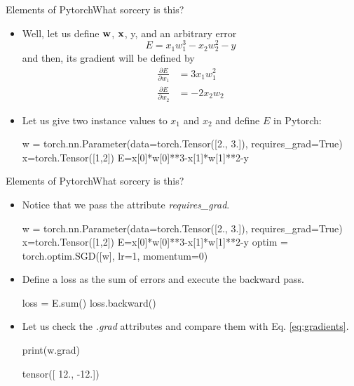 \documentclass{beamer}
\begin{document}
\begin{frame}[fragile]{Elements of Pytorch}{What sorcery is this?}
\begin{itemize}
    \item Well, let us define ${\bf w}$, ${\bf x}$, y, and an arbitrary error 
    \begin{equation}
    E = x_1w_1^3 -x_2w_2^2-y
    \end{equation}
    and then, its gradient will be defined by 
    \begin{equation}\label{eq:gradients}
        \begin{split}
            \frac{\partial E}{\partial w_1}&=3x_1w_1^2\\
            \frac{\partial E}{\partial w_2}&=-2x_2w_2
        \end{split}
    \end{equation}
    \item Let us give two instance values to $x_1$ and $x_2$ and define $E$ in Pytorch:
\begin{python}
w = torch.nn.Parameter(data=torch.Tensor([2., 3.]), requires_grad=True)
x=torch.Tensor([1,2]) 
E=x[0]*w[0]**3-x[1]*w[1]**2-y
\end{python}
\end{itemize}
\end{frame}

\begin{frame}[fragile]{Elements of Pytorch}{What sorcery is this?}
\begin{itemize}
    \item Notice that we pass the attribute \emph{requires\_grad}.
\begin{python}
w = torch.nn.Parameter(data=torch.Tensor([2., 3.]), requires_grad=True)
x=torch.Tensor([1,2]) 
E=x[0]*w[0]**3-x[1]*w[1]**2-y
optim = torch.optim.SGD([w], lr=1, momentum=0)
\end{python}
\item Define a loss as the sum of errors and execute the backward pass.
\begin{python}
loss = E.sum()
loss.backward()  
\end{python}
\item Let us check the \emph{.grad} attributes and compare them with Eq. \eqref{eq:gradients}.
\vspace{-0.5cm}

\begin{multicols}{2}
\begin{python}
print(w.grad)
\end{python}
\columnbreak
\begin{python}
tensor([ 12., -12.])
\end{python}

\end{multicols}
\end{itemize}
\end{frame}
\end{document}
